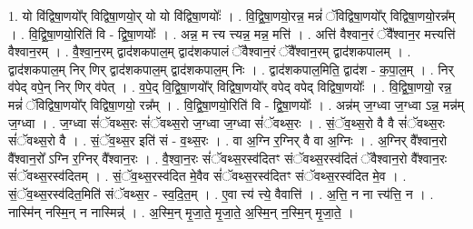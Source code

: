 \documentclass[17pt]{extarticle}
\begin{document}
1. यो वि॑द्विषा॒णयो᳚र् विद्विषा॒णयो॒र् यो यो वि॑द्विषा॒णयोः᳚ । . वि॒द्वि॒षा॒णयो॒रन्न॒ मन्नं॑ ॅविद्विषा॒णयो᳚र् विद्विषा॒णयो॒रन्न᳚म् । . वि॒द्वि॒षा॒णयो॒रिति॑ वि - द्वि॒षा॒णयोः᳚ । . अन्न॒ म त्त्य त्त्यन्न॒ मन्न॒ मत्ति॑ । . अत्ति॑ वैश्वान॒रं ॅवै᳚श्वान॒र मत्त्यत्ति॑ वैश्वान॒रम् । . वै॒श्वा॒न॒रम् द्वाद॑शकपाल॒म् द्वाद॑शकपालं ॅवैश्वान॒रं ॅवै᳚श्वान॒रम् द्वाद॑शकपालम् । . द्वाद॑शकपाल॒म् निर् णिर् द्वाद॑शकपाल॒म् द्वाद॑शकपाल॒म् निः । . द्वाद॑शकपाल॒मिति॒ द्वाद॑श - क॒पा॒ल॒म् । . निर् व॑पेद् वपे॒न् निर् णिर् व॑पेत् । . व॒पे॒द् वि॒द्वि॒षा॒णयो᳚र् विद्विषा॒णयो᳚र् वपेद् वपेद् विद्विषा॒णयोः᳚ । . वि॒द्वि॒षा॒णयो॒ रन्न॒ मन्नं॑ ॅविद्विषा॒णयो᳚र् विद्विषा॒णयो॒ रन्न᳚म् । . वि॒द्वि॒षा॒णयो॒रिति॑ वि - द्वि॒षा॒णयोः᳚ । . अन्न॑म् ज॒ग्ध्वा ज॒ग्ध्वा ऽन्न॒ मन्न॑म् ज॒ग्ध्वा । . ज॒ग्ध्वा सं॑ॅवथ्स॒रः सं॑ॅवथ्स॒रो ज॒ग्ध्वा ज॒ग्ध्वा सं॑ॅवथ्स॒रः । . सं॒ॅव॒थ्स॒रो वै वै सं॑ॅवथ्स॒रः सं॑ॅवथ्स॒रो वै । . सं॒ॅव॒थ्स॒र इति॑ सं - व॒थ्स॒रः । . वा अ॒ग्नि र॒ग्निर् वै वा अ॒ग्निः । . अ॒ग्निर् वै᳚श्वान॒रो वै᳚श्वान॒रो᳚ ऽग्नि र॒ग्निर् वै᳚श्वान॒रः । . वै॒श्वा॒न॒रः सं॑ॅवथ्स॒रस्व॑दितꣳ संॅवथ्स॒रस्व॑दितं ॅवैश्वान॒रो वै᳚श्वान॒रः सं॑ॅवथ्स॒रस्व॑दितम् । . सं॒ॅव॒थ्स॒रस्व॑दित मे॒वैव सं॑ॅवथ्स॒रस्व॑दितꣳ संॅवथ्स॒रस्व॑दित मे॒व । . सं॒ॅव॒थ्स॒रस्व॑दित॒मिति॑ संॅवथ्स॒र - स्व॒दि॒त॒म् । . ए॒वा त्त्य॑ त्त्ये॒ वैवात्ति॑ । . अ॒त्ति॒ न ना त्त्य॑त्ति॒ न । . नास्मि॑न् नस्मि॒न् न नास्मिन्न्॑ । . अ॒स्मि॒न् मृ॒जा॒ते॒ मृ॒जा॒ते॒ अ॒स्मि॒न् न॒स्मि॒न् मृ॒जा॒ते॒ । \newline
\end{document}
